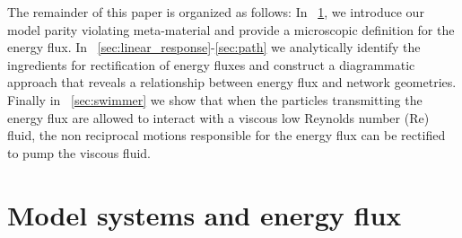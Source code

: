 \documentclass[
 preprint,
 preprintnumbers,
 amsmath,amssymb,
 aps,
 pre,
 longbibliography,
 superscriptaddress,
 10pt, twocolumn
]{revtex4-1}
\begin{document}




The remainder of this paper is organized as follows:
In \secname~\ref{sec:model}, we introduce our model parity violating meta-material and provide a microscopic definition for the energy flux.
In \secname~\ref{sec:linear_response}-\ref{sec:path} we analytically identify the ingredients for rectification of energy fluxes and construct a diagrammatic approach that reveals a relationship between energy flux and network geometries.
Finally in \secname~\ref{sec:swimmer} we show that when the particles transmitting the energy flux are allowed to interact with a viscous low Reynolds number (Re) fluid, the non reciprocal motions responsible for the energy flux can be rectified to pump the viscous fluid. 

\section{Model systems and energy flux} \label{sec:model}
\end{document}
